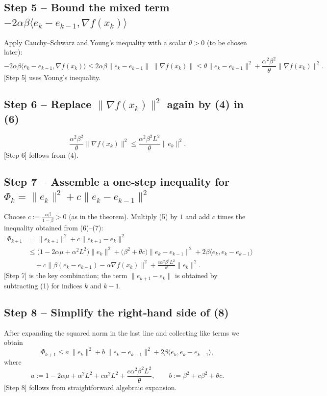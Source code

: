 \documentclass[11pt]{article}
\begin{document}
\subsection*{Step 5 – Bound the mixed term $-2\alpha\beta\langle e_{k}-e_{k-1},\nabla f(x_{k})\rangle$}
Apply Cauchy–Schwarz and Young’s inequality with a scalar $\theta>0$ (to be chosen later):
\[
-2\alpha\beta\langle e_{k}-e_{k-1},\nabla f(x_{k})\rangle
\le 2\alpha\beta\|e_{k}-e_{k-1}\|\;\|\nabla f(x_{k})\|
\le \theta\|e_{k}-e_{k-1}\|^{2}+\frac{\alpha^{2}\beta^{2}}{\theta}\|\nabla f(x_{k})\|^{2}.
\tag{6}
\]
[Step 5] uses Young’s inequality.

\subsection*{Step 6 – Replace $\|\nabla f(x_{k})\|^{2}$ again by (4) in (6)}
\[
\frac{\alpha^{2}\beta^{2}}{\theta}\|\nabla f(x_{k})\|^{2}
\le \frac{\alpha^{2}\beta^{2}L^{2}}{\theta}\|e_{k}\|^{2}.
\tag{7}
\]
[Step 6] follows from (4).

\subsection*{Step 7 – Assemble a one‑step inequality for $\Phi_{k}= \|e_{k}\|^{2}+c\|e_{k}-e_{k-1}\|^{2}$}
Choose $c:=\frac{\alpha\beta}{1-\beta}>0$ (as in the theorem).  
Multiply (5) by $1$ and add $c$ times the inequality obtained from (6)–(7):
\begin{align}
\Phi_{k+1}
&= \|e_{k+1}\|^{2}+c\|e_{k+1}-e_{k}\|^{2}\nonumber\\
&\le \bigl(1-2\alpha\mu+\alpha^{2}L^{2}\bigr)\|e_{k}\|^{2}
    +\bigl(\beta^{2}+ \theta c\bigr)\|e_{k}-e_{k-1}\|^{2}
    +2\beta\langle e_{k},e_{k}-e_{k-1}\rangle \nonumber\\
&\quad +c\bigl\| \beta(e_{k}-e_{k-1})-\alpha\nabla f(x_{k})\bigr\|^{2}
    +\frac{c\alpha^{2}\beta^{2}L^{2}}{\theta}\|e_{k}\|^{2}. \tag{8}
\end{align}
[Step 7] is the key combination; the term $\|e_{k+1}-e_{k}\|$ is obtained by subtracting (1) for indices $k$ and $k-1$.

\subsection*{Step 8 – Simplify the right‑hand side of (8)}
After expanding the squared norm in the last line and collecting like terms we obtain
\[
\Phi_{k+1}\le a\,\|e_{k}\|^{2}+b\,\|e_{k}-e_{k-1}\|^{2}+2\beta\langle e_{k},e_{k}-e_{k-1}\rangle,
\tag{9}
\]
where
\[
a:=1-2\alpha\mu+\alpha^{2}L^{2}+c\alpha^{2}L^{2}+\frac{c\alpha^{2}\beta^{2}L^{2}}{\theta},
\qquad
b:=\beta^{2}+c\beta^{2}+ \theta c .
\tag{10}
\]
[Step 8] follows from straightforward algebraic expansion.
\end{document}
